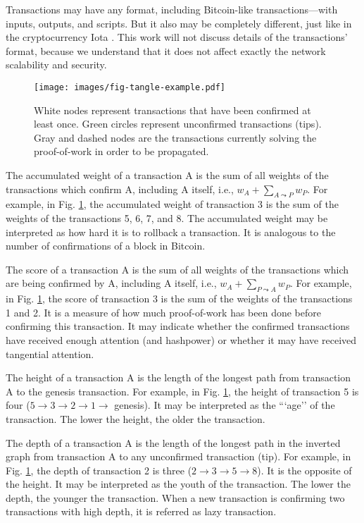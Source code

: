 Transactions may have any format, including Bitcoin-like transactions---with inputs, outputs, and scripts. But it also may be completely different, just like in the cryptocurrency Iota \citep{tangle2016}. This work will not discuss details of the transactions' format, because we understand that it does not affect exactly the network scalability and security.

\begin{figure}[ht]
\centering\texttt{[image: images/fig-tangle-example.pdf]}
\caption{White nodes represent transactions that have been confirmed at least once. Green circles represent unconfirmed transactions (tips). Gray and dashed nodes are the transactions currently solving the proof-of-work in order to be propagated.\label{fig-tangle-example}}
\end{figure}

The accumulated weight of a transaction A is the sum of all weights of the transactions which confirm A, including A itself, i.e., $w_A + \sum_{A \leadsto P} w_P$. For example, in Fig. \ref{fig-tangle-example}, the accumulated weight of transaction 3 is the sum of the weights of the transactions 5, 6, 7, and 8. The accumulated weight may be interpreted as how hard it is to rollback a transaction. It is analogous to the number of confirmations of a block in Bitcoin.

The score of a transaction A is the sum of all weights of the transactions which are being confirmed by A, including A itself, i.e., $w_A + \sum_{P \leadsto A} w_P$. For example, in Fig. \ref{fig-tangle-example}, the score of transaction 3 is the sum of the weights of the transactions 1 and 2. It is a measure of how much proof-of-work has been done before confirming this transaction. It may indicate whether the confirmed transactions have received enough attention (and hashpower) or whether it may have received tangential attention.

The height of a transaction A is the length of the longest path from transaction A to the genesis transaction. For example, in Fig. \ref{fig-tangle-example}, the height of transaction 5 is four ($5 \rightarrow 3 \rightarrow 2 \rightarrow 1 \rightarrow$ genesis). It may be interpreted as the “`age'' of the transaction. The lower the height, the older the transaction.

The depth of a transaction A is the length of the longest path in the inverted graph from transaction A to any unconfirmed transaction (tip). For example, in Fig. \ref{fig-tangle-example}, the depth of transaction 2 is three ($2 \rightarrow 3 \rightarrow 5 \rightarrow 8$). It is the opposite of the height. It may be interpreted as the youth of the transaction. The lower the depth, the younger the transaction. When a new transaction is confirming two transactions with high depth, it is referred as lazy transaction.

